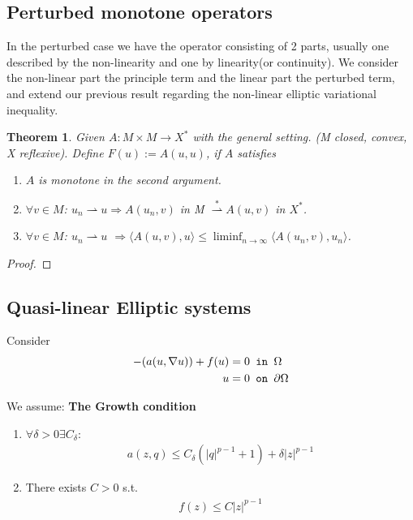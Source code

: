 \documentclass[a4paper,11pt,oneside,fleqn]{book}
\newtheorem{theorem}{Theorem}[section]
\theoremstyle{definition}
\theoremstyle{remark}
\let\div\relax
\DeclareMathOperator{\div}{div}
\begin{document}
\subsection{Perturbed monotone operators}
In the perturbed case we have the operator consisting of 2 parts, usually one described by the non-linearity and one by linearity(or continuity). We consider the non-linear part the principle term and the linear part the perturbed term, and extend our previous result regarding the non-linear elliptic variational inequality. 
\begin{theorem}
	Given $A: M \times M \rightarrow X^*$ with the general setting. (M closed, convex, X reflexive). Define $F(u):= A(u, u)$, if $A$ satisfies
	\begin{enumerate}
		\item $A$ is monotone in the second argument.
		\item $\forall v \in M$:  $u_n \rightharpoonup u \Rightarrow A(u_n, v)$ in M $\overset{*}{\rightharpoonup} A(u, v)$ in $X^*$.
		\item $\forall v \in M$: $u_n \rightharpoonup u$ $\Rightarrow \langle A(u, v), u \rangle \le \liminf_{n \rightarrow \infty} \langle A(u_n, v), u_n  \rangle$.   
	\end{enumerate}
\end{theorem}
\begin{proof}
\end{proof}


\subsection{Quasi-linear Elliptic systems}
Consider
\begin{align*}
	- \div (a(u, \nabla u) ) + f(u) = 0 & \texttt{ in } \Omega\\
	u = 0 & \texttt{ on } \partial \Omega 
\end{align*}

We assume:
\textbf{The Growth condition}
\begin{enumerate}
	\item $\forall \delta > 0 \exists C_\delta$:
	\begin{align*}
		a(z, q) \le C_\delta (|q|^{p -1} + 1) + \delta |z|^{p -1}
	\end{align*}
	\item There exists $C > 0$ s.t.
	\begin{align*}
		f(z) \le C |z|^{p - 1}
	\end{align*}
\end{enumerate}
\end{document}
